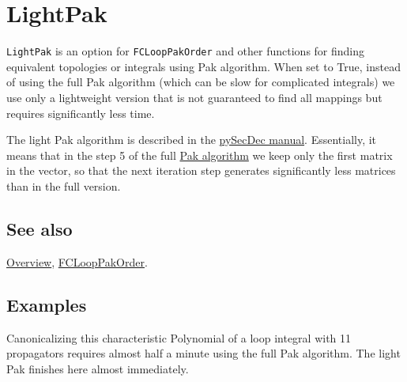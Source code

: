 \documentclass[../FeynCalcManual.tex]{subfiles}
\begin{document}
\hypertarget{lightpak}{
\section{LightPak}\label{lightpak}}

\texttt{LightPak} is an option for \texttt{FCLoopPakOrder} and other
functions for finding equivalent topologies or integrals using Pak
algorithm. When set to True, instead of using the full Pak algorithm
(which can be slow for complicated integrals) we use only a lightweight
version that is not guaranteed to find all mappings but requires
significantly less time.

The light Pak algorithm is described in the
\href{https://secdec.readthedocs.io/en/stable/full_reference.html}{pySecDec
manual}. Essentially, it means that in the step 5 of the full
\href{https://arxiv.org/pdf/1111.0868.pdf}{Pak algorithm} we keep only
the first matrix in the vector, so that the next iteration step
generates significantly less matrices than in the full version.

\subsection{See also}

\hyperlink{toc}{Overview}, \hyperlink{fclooppakorder}{FCLoopPakOrder}.

\subsection{Examples}

Canonicalizing this characteristic Polynomial of a loop integral with 11
propagators requires almost half a minute using the full Pak algorithm.
The light Pak finishes here almost immediately.
\end{document}
